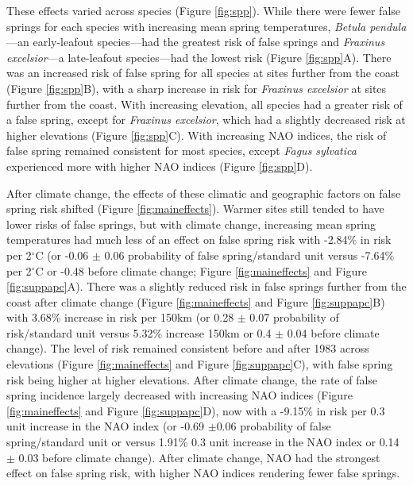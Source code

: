 \documentclass{article}\usepackage[]{graphicx}\usepackage[]{color}
\begin{document}
These effects varied across species (Figure \ref{fig:spp}). While there were fewer false springs for each species with increasing mean spring temperatures,  \textit{Betula pendula}---an early-leafout species---had the greatest risk of false springs and \textit{Fraxinus excelsior}---a late-leafout species---had the lowest risk (Figure \ref{fig:spp}A). There was an increased risk of false spring for all species at sites further from the coast (Figure \ref{fig:spp}B), with a sharp increase in risk for \textit{Fraxinus excelsior} at sites further from the coast. With increasing elevation, all species had a greater risk of a false spring, except for \textit{Fraxinus excelsior}, which had a slightly decreased risk at higher elevations (Figure \ref{fig:spp}C).  With increasing NAO indices, the risk of false spring remained consistent for most species, except \textit{Fagus sylvatica} experienced more with higher NAO indices (Figure \ref{fig:spp}D). 

After climate change, the effects of these climatic and geographic factors on false spring risk shifted (Figure \ref{fig:maineffects}). Warmer sites still tended to have lower risks of false springs, but with climate change, increasing mean spring temperatures had much less of an effect on false spring risk with -2.84\% in risk per 2$^{\circ}$C (or -0.06 $\pm$ 0.06 probability of false spring/standard unit versus -7.64\% per 2$^{\circ}$C or -0.48 before climate change; Figure \ref{fig:maineffects} and Figure \ref{fig:suppapc}A). There was a slightly reduced risk in false springs further from the coast after climate change (Figure \ref{fig:maineffects} and Figure \ref{fig:suppapc}B) with 3.68\% increase in risk per 150km (or 0.28 $\pm$ 0.07 probability of risk/standard unit versus 5.32\% increase 150km or 0.4 $\pm$ 0.04 before climate change). The level of risk remained consistent before and after 1983 across elevations (Figure \ref{fig:maineffects} and Figure \ref{fig:suppapc}C), with false spring risk being higher at higher elevations. After climate change, the rate of false spring incidence largely decreased with increasing NAO indices (Figure \ref{fig:maineffects} and Figure \ref{fig:suppapc}D), now with a -9.15\% in risk per 0.3 unit increase in the NAO index (or -0.69 $\pm$0.06 probability of false spring/standard unit or versus 1.91\% 0.3 unit increase in the NAO index or 0.14 $\pm$ 0.03 before climate change). After climate change, NAO had the strongest effect on false spring risk, with higher NAO indices rendering fewer false springs.
\end{document}
